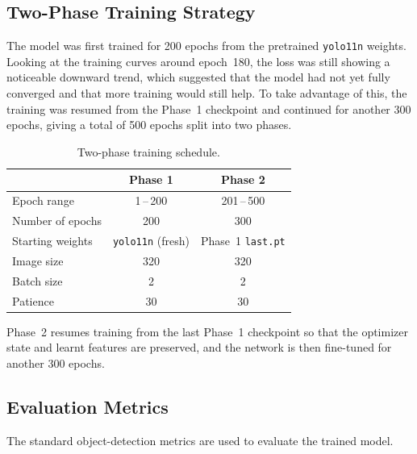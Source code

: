 \documentclass[12pt,a4paper]{report}
\begin{document}
\subsection{Two-Phase Training Strategy}
The model was first trained for 200 epochs from the pretrained
\texttt{yolo11n} weights. Looking at the training curves around epoch~180, the
loss was still showing a noticeable downward trend, which suggested that the
model had not yet fully converged and that more training would still help. To
take advantage of this, the training was resumed from the Phase~1 checkpoint
and continued for another 300 epochs, giving a total of 500 epochs split into
two phases.

\begin{table}[H]
\centering
\caption{Two-phase training schedule.}
\label{tab:phases}
\begin{tabular}{lcc}
\toprule
\textbf{}                & \textbf{Phase 1}               & \textbf{Phase 2} \\
\midrule
Epoch range              & 1\,--\,200                     & 201\,--\,500 \\
Number of epochs         & 200                            & 300 \\
Starting weights         & \texttt{yolo11n} (fresh)       & Phase~1 \texttt{last.pt} \\
Image size               & 320                            & 320 \\
Batch size               & 2                              & 2 \\
Patience                 & 30                             & 30 \\
\bottomrule
\end{tabular}
\end{table}

Phase~2 resumes training from the last Phase~1 checkpoint so that the optimizer
state and learnt features are preserved, and the network is then fine-tuned for
another 300 epochs.

\subsection{Evaluation Metrics}
The standard object-detection metrics are used to evaluate the trained model.
\end{document}
